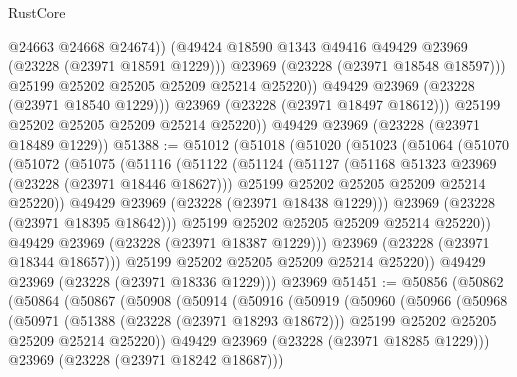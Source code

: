 \begin{lexlean}{RustCore}
\begin{coremodule}
                      @24663
                      @24668
                      @24674))
                  (@49424 @18590 @1343 @49416 @49429 @23969 (@23228 (@23971 @18591 @1229)))
                  @23969
                  (@23228 (@23971 @18548 @18597)))
                @25199
                @25202
                @25205
                @25209
                @25214
                @25220))
            @49429
            @23969
            (@23228 (@23971 @18540 @1229)))
          @23969
          (@23228 (@23971 @18497 @18612)))
        @25199
        @25202
        @25205
        @25209
        @25214
        @25220))
    @49429
    @23969
    (@23228 (@23971 @18489 @1229))
@51388 := @51012
    (@51018
      (@51020
        (@51023
          (@51064
            (@51070
              (@51072
                (@51075
                  (@51116
                    (@51122
                      (@51124
                        (@51127
                          (@51168 @51323 @23969 (@23228 (@23971 @18446 @18627)))
                          @25199
                          @25202
                          @25205
                          @25209
                          @25214
                          @25220))
                      @49429
                      @23969
                      (@23228 (@23971 @18438 @1229)))
                    @23969
                    (@23228 (@23971 @18395 @18642)))
                  @25199
                  @25202
                  @25205
                  @25209
                  @25214
                  @25220))
              @49429
              @23969
              (@23228 (@23971 @18387 @1229)))
            @23969
            (@23228 (@23971 @18344 @18657)))
          @25199
          @25202
          @25205
          @25209
          @25214
          @25220))
      @49429
      @23969
      (@23228 (@23971 @18336 @1229)))
    @23969
@51451 := @50856
    (@50862
      (@50864
        (@50867
          (@50908
            (@50914
              (@50916
                (@50919
                  (@50960
                    (@50966
                      (@50968
                        (@50971
                          (@51388 (@23228 (@23971 @18293 @18672)))
                          @25199
                          @25202
                          @25205
                          @25209
                          @25214
                          @25220))
                      @49429
                      @23969
                      (@23228 (@23971 @18285 @1229)))
                    @23969
                    (@23228 (@23971 @18242 @18687)))

\end{coremodule}
\end{lexlean}
